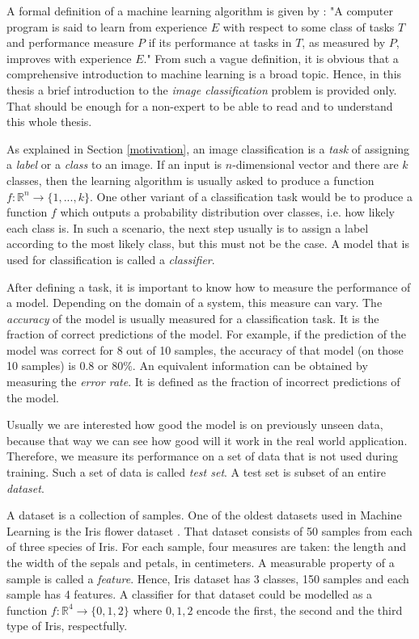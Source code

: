 A formal definition of a machine learning algorithm is given by \cite{Mitchell:1997:ML:541177}: "A computer program is said to learn from experience $E$ with respect to some class of tasks $T$ and performance measure $P$ if its performance at tasks in $T$, as measured by $P$, improves with experience $E$." 
From such a vague definition, it is obvious that a comprehensive introduction to machine learning is a broad topic. Hence, in this thesis a brief introduction to the \textit{image classification} problem is provided only. That should be enough for a non-expert to be able to read and to understand this whole thesis.

As explained in Section \ref{motivation}, an image classification is a \textit{task} of assigning a \textit{label} or a \textit{class} to an image. If an input is $n$-dimensional vector and there are $k$ classes, then the learning algorithm is usually asked to produce a function $f: \mathbb{R}^n \rightarrow \{1, ... , k\}$. One other variant of a classification task would be to produce a function $f$ which outputs a probability distribution over classes, i.e. how likely each class is. In such a scenario, the next step usually is to assign a label according to the most likely class, but this must not be the case. A model that is used for classification is called a \textit{classifier}.

After defining a task, it is important to know how to measure the performance of a model. Depending on the domain of a system, this measure can vary. The \textit{accuracy} of the model is usually measured for a classification task. It is the fraction of correct predictions of the model. For example, if the prediction of the model was correct for 8 out of 10 samples, the accuracy of that model (on those 10 samples) is $0.8$ or $80\%$. An equivalent information can be obtained by measuring the \textit{error rate}. It is defined as the fraction of incorrect predictions of the model. 

Usually we are interested how good the model is on previously unseen data, because that way we can see how good will it work in the real world application. Therefore, we measure its performance on a set of data that is not used during training. Such a set of data is called \textit{test set}. A test set is subset of an entire \textit{dataset}.

A dataset is a collection of samples. One of the oldest datasets used in Machine Learning is the Iris flower dataset \cite{iris-dataset}. That dataset consists of 50 samples from each of three species of Iris. For each sample, four measures are taken: the length and the width of the sepals and petals, in centimeters. A measurable property of a sample is called a \textit{feature}. Hence, Iris dataset has 3 classes, 150 samples and each sample has 4 features. A classifier for that dataset could be modelled as a function $f: \mathbb{R}^4 \rightarrow \{0, 1, 2\}$ where $0, 1, 2$  encode the first, the second and the third type of Iris, respectfully.

